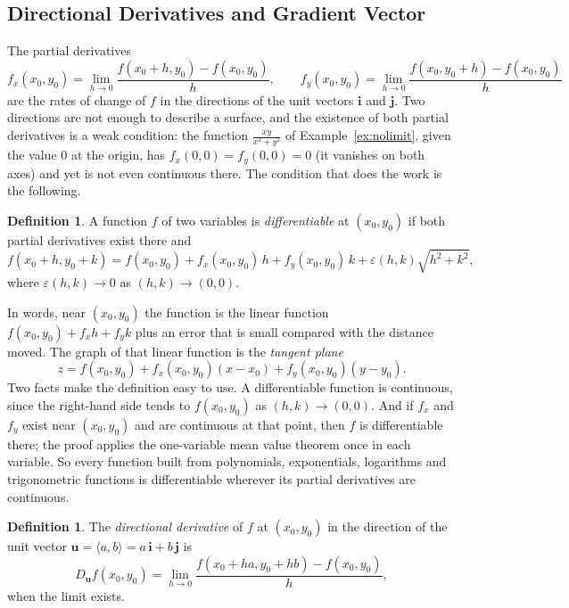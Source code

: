 \documentclass[11pt,a4paper]{article}
\theoremstyle{definition}
\newtheorem{defn}[thm]{Definition}
\begin{document}
{\color[wave]{485}\subsection{Directional Derivatives and Gradient Vector}}

The partial derivatives
\[f_x(x_0,y_0) = \lim_{h\to 0} \frac{f(x_0 + h, y_0) - f(x_0,y_0)}{h},\qquad
f_y(x_0,y_0) = \lim_{h\to 0} \frac{f(x_0, y_0 +h) - f(x_0,y_0)}{h}\]
are the rates of change of $f$ in the directions of the unit vectors $\mathbf i$
and $\mathbf j$. Two directions are not enough to describe a surface, and the
existence of both partial derivatives is a weak condition: the function
$\frac{xy}{x^2+y^2}$ of Example~\ref{ex:nolimit}, given the value $0$ at the
origin, has $f_x(0,0) = f_y(0,0) = 0$ (it vanishes on both axes) and yet is not
even continuous there. The condition that does the work is the following.

\begin{defn}
\label{defn:differentiable}
A function $f$ of two variables is \emph{differentiable} at $(x_0,y_0)$ if both
partial derivatives exist there and
\[f(x_0+h,y_0+k) = f(x_0,y_0) + f_x(x_0,y_0)\,h + f_y(x_0,y_0)\,k +
\varepsilon(h,k)\sqrt{h^2+k^2},\]
where $\varepsilon(h,k)\to 0$ as $(h,k)\to(0,0)$.
\end{defn}

In words, near $(x_0,y_0)$ the function is the linear function
$f(x_0,y_0) + f_x h + f_y k$ plus an error that is small compared with the
distance moved. The graph of that linear function is the \emph{tangent plane}
\[z = f(x_0,y_0) + f_x(x_0,y_0)(x-x_0) + f_y(x_0,y_0)(y-y_0).\]
Two facts make the definition easy to use. A differentiable function is
continuous, since the right-hand side tends to $f(x_0,y_0)$ as
$(h,k)\to(0,0)$. And if $f_x$ and $f_y$ exist near $(x_0,y_0)$ and are
continuous at that point, then $f$ is differentiable there; the proof applies the
one-variable mean value theorem once in each variable. So every function built
from polynomials, exponentials, logarithms and trigonometric functions is
differentiable wherever its partial derivatives are continuous.

\begin{defn}
\label{defn:directional}
The \emph{directional derivative} of $f$ at $(x_0,y_0)$ in the direction of the
unit vector $\mathbf u = \langle a, b\rangle = a\,\mathbf i + b\,\mathbf j$ is
\[D_{\mathbf u} f(x_0,y_0) = \lim_{h\to 0} \frac{f(x_0 + ha, y_0+hb) -
f(x_0,y_0)}{h},\]
when the limit exists.
\end{defn}
\end{document}
